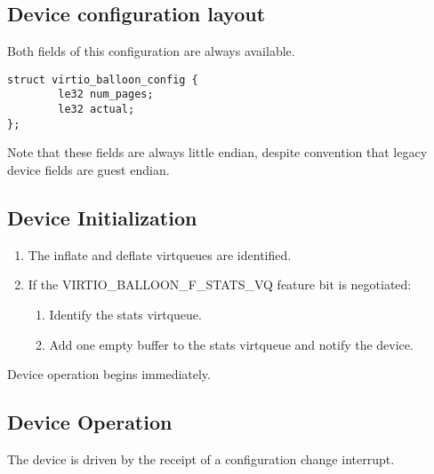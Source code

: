 \subsection{Device configuration layout}\label{sec:Device Types / Memory Balloon Device / Device configuration layout}
  Both fields of this configuration
  are always available.

\begin{lstlisting}
struct virtio_balloon_config {
        le32 num_pages;
        le32 actual;
};
\end{lstlisting}

Note that these fields are always little endian, despite convention
that legacy device fields are guest endian.

\subsection{Device Initialization}\label{sec:Device Types / Memory Balloon Device / Device Initialization}

\begin{enumerate}
\item The inflate and deflate virtqueues are identified.

\item If the VIRTIO_BALLOON_F_STATS_VQ feature bit is negotiated:
  \begin{enumerate}
  \item Identify the stats virtqueue.

  \item Add one empty buffer to the stats virtqueue and notify the
    device.
  \end{enumerate}
\end{enumerate}

Device operation begins immediately.

\subsection{Device Operation}\label{sec:Device Types / Memory Balloon Device / Device Operation}

The device is driven by the receipt of a
configuration change interrupt.

